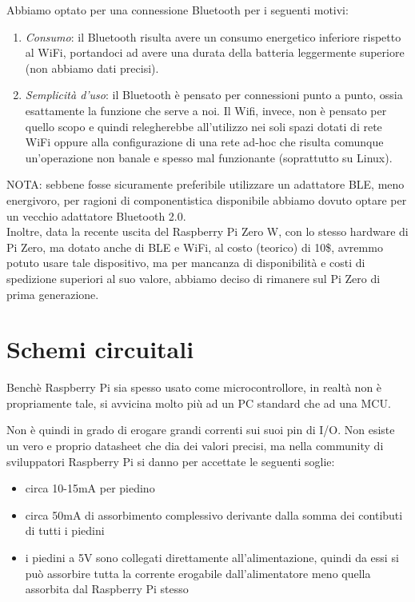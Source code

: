 \documentclass[12pt]{article}
\newcommand{\raspi}{Raspberry Pi}
\newcommand{\raszero} {\raspi{} Zero}
\begin{document}
Abbiamo optato per una connessione Bluetooth per i seguenti motivi:
\begin{enumerate}
\item \emph{Consumo}: il Bluetooth risulta avere un consumo energetico inferiore rispetto al WiFi, portandoci ad avere una durata della batteria leggermente superiore (non abbiamo dati precisi).
\item \emph{Semplicità d'uso}: il Bluetooth è pensato per connessioni punto a punto, ossia esattamente la funzione che serve a noi. Il Wifi, invece, non è pensato per quello scopo e quindi relegherebbe all'utilizzo nei soli spazi dotati di rete WiFi oppure alla configurazione di una rete ad-hoc che risulta comunque un'operazione non banale e spesso mal funzionante (soprattutto su Linux).
\end{enumerate}

\bigskip
\bigskip

NOTA: sebbene fosse sicuramente preferibile utilizzare un adattatore BLE, meno energivoro, per ragioni di componentistica disponibile abbiamo dovuto optare per un vecchio adattatore Bluetooth 2.0.\\
Inoltre, data la recente uscita del \raszero{} W, con lo stesso hardware di Pi Zero, ma dotato anche di BLE e WiFi, al costo (teorico) di 10\$, avremmo potuto usare tale dispositivo, ma per mancanza di disponibilità e costi di spedizione superiori al suo valore, abbiamo deciso di rimanere sul Pi Zero di prima generazione. 

\section{Schemi circuitali}

Benchè \raspi{} sia spesso usato come microcontrollore, in realtà non è propriamente tale, si avvicina molto più ad un PC standard che ad una MCU.

Non è quindi in grado di erogare grandi correnti sui suoi pin di I/O. Non esiste un vero e proprio datasheet che dia dei valori precisi, ma nella community di sviluppatori \raspi{} si danno per accettate le seguenti soglie:
\begin{itemize}
\item circa 10-15mA per piedino
\item circa 50mA di assorbimento complessivo derivante dalla somma dei contibuti di tutti i piedini
\item i piedini a 5V sono collegati direttamente all'alimentazione, quindi da essi si può assorbire tutta la corrente erogabile dall'alimentatore meno quella assorbita dal \raspi{} stesso
\end{itemize}
\end{document}
